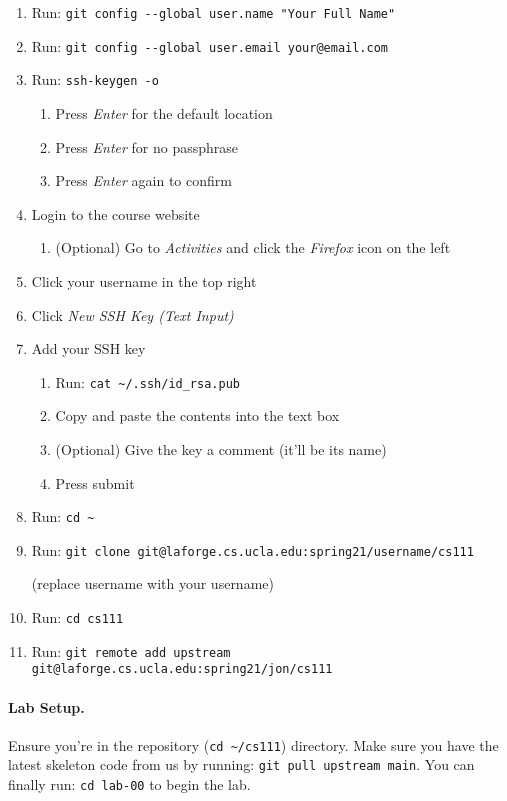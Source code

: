 \begin{enumerate}
  \item Run: \lstinline|git config --global user.name "Your Full Name"|
  \item Run: \lstinline|git config --global user.email your@email.com|
  \item Run: \lstinline|ssh-keygen -o|
    \begin{enumerate}
      \item Press \textit{Enter} for the default location
      \item Press \textit{Enter} for no passphrase
      \item Press \textit{Enter} again to confirm
    \end{enumerate}
  \item Login to the course website
    \begin{enumerate}
      \item (Optional) Go to \textit{Activities} and click the \textit{Firefox}
            icon on the left
    \end{enumerate}
  \item Click your username in the top right
  \item Click \textit{New SSH Key (Text Input)}
  \item Add your SSH key
    \begin{enumerate}
      \item Run: \lstinline|cat ~/.ssh/id_rsa.pub|
      \item Copy and paste the contents into the text box
      \item (Optional) Give the key a comment (it'll be its name)
      \item Press submit
    \end{enumerate}
  
  \item Run: \lstinline|cd ~|
  \item Run: \lstinline|git clone git@laforge.cs.ucla.edu:spring21/username/cs111|

        (replace username with your username)
  \item Run: \lstinline|cd cs111|
  \item Run: \lstinline|git remote add upstream git@laforge.cs.ucla.edu:spring21/jon/cs111|
\end{enumerate}

\paragraph{Lab Setup.}
Ensure you're in the repository (\lstinline|cd ~/cs111|) directory.
Make sure you have the latest skeleton code from us by running:
\lstinline|git pull upstream main|.
You can finally run: \lstinline|cd lab-00| to begin the lab.

